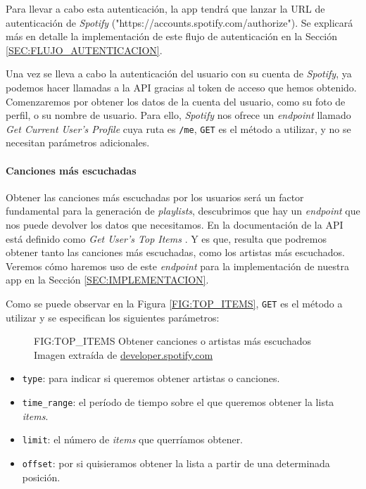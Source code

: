 Para llevar a cabo esta autenticación, la app tendrá que lanzar la URL de autenticación de \textit{Spotify}
("https://accounts.spotify.com/authorize"). Se explicará más en detalle la implementación de este flujo de autenticación
en la Sección \ref{SEC:FLUJO_AUTENTICACION}.

Una vez se lleva a cabo la autenticación del usuario con su cuenta de \textit{Spotify}, ya podemos hacer llamadas a la API
gracias al token de acceso que hemos obtenido. Comenzaremos por obtener los datos de la cuenta del usuario, como su foto de perfil, o su
nombre de usuario. Para ello, \textit{Spotify} nos ofrece un \textit{endpoint} llamado \textit{Get Current User's Profile} \cite{current_user_profile} cuya 
ruta es \texttt{/me}, \texttt{GET} es el método a utilizar, y no se necesitan parámetros adicionales.

\paragraph{Canciones más escuchadas\label{subsec:canciones_mas_escuchadas}}

Obtener las canciones más escuchadas por los usuarios será un factor fundamental para la generación de \textit{playlists}, descubrimos que hay un 
\textit{endpoint} que nos puede devolver los datos que necesitamos. En la documentación de la API \cite{spotify_api} está definido como 
\textit{Get User's Top Items} \cite{top_items}. Y es que, resulta que podremos obtener tanto las canciones más escuchadas, como los artistas más escuchados. 
Veremos cómo haremos uso de este \textit{endpoint} para la implementación de nuestra app en la Sección \ref{SEC:IMPLEMENTACION}. 

Como se puede observar en la Figura \ref{FIG:TOP_ITEMS}, \texttt{GET} es el método a utilizar y se especifican los siguientes parámetros:

\begin{figure}[Obtener canciones o artistas más escuchados]{FIG:TOP_ITEMS}
  {Obtener canciones o artistas más escuchados \\
  {\scriptsize Imagen extraída de \href{https://developer.spotify.com/documentation/web-api/reference/get-users-top-artists-and-tracks}{developer.spotify.com}}}
\end{figure}

\begin{itemize}
  \item \texttt{type}: para indicar si queremos obtener artistas o canciones.
  \item \texttt{time\_range}: el período de tiempo sobre el que queremos obtener la lista \textit{items}.
  \item \texttt{limit}: el número de \textit{items} que querríamos obtener.
  \item \texttt{offset}: por si quisieramos obtener la lista a partir de una determinada posición.
\end{itemize}


